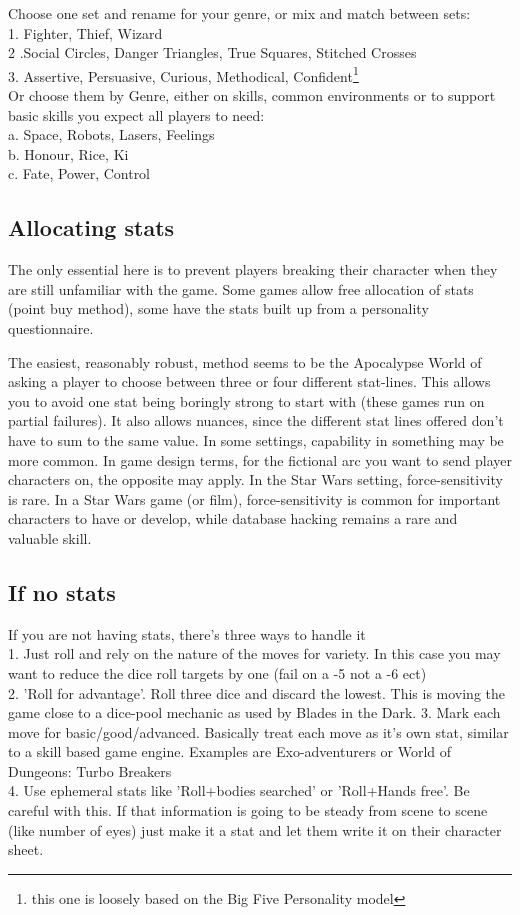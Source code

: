 \documentclass{tufte-handout}
\begin{document}
Choose one set and rename for your genre, or mix and match between sets:\\
1. Fighter, Thief, Wizard\\
2 .Social Circles, Danger Triangles, True Squares, Stitched Crosses \\
3. Assertive, Persuasive, Curious, Methodical, Confident\footnote{this one is loosely based on the Big Five Personality model}\\

Or choose them by Genre, either on skills, common environments or to support basic skills you expect all players to need:\\ 
a. Space, Robots, Lasers,  Feelings\\
b. Honour, Rice, Ki\\
c. Fate, Power, Control \\

\subsection{Allocating stats}

The only essential here is to prevent players breaking their character when they are still unfamiliar with the game. Some games allow free allocation of stats (point buy method), some have the stats built up from a personality questionnaire.

The easiest, reasonably robust, method seems to be the Apocalypse World of asking a player to choose between three or four different stat-lines. This allows you to avoid one stat being boringly strong to start with (these games run on partial failures). It also allows nuances, since the different stat lines offered don't have to sum to the same value. In some settings, capability in something may be more common. In game design terms, for the fictional arc you want to send player characters on, the opposite may apply. In the Star Wars setting, force-sensitivity is rare. In a Star Wars game (or film), force-sensitivity is common for important characters to have or develop, while database hacking remains a rare and valuable skill. 


\subsection{If no stats}
If you are not having stats, there's three ways to  handle it\\
1. Just roll and rely on the nature of the moves for variety. In this case you may want to reduce the dice roll targets by one (fail on a -5 not a -6 ect)\\
2. 'Roll for advantage'. Roll three dice and discard the lowest. This is moving the game close to a dice-pool mechanic as used by Blades in the Dark.
3. Mark each move for basic/good/advanced. Basically treat each move as it's own stat, similar to a skill based game engine. Examples are Exo-adventurers or World of Dungeons: Turbo Breakers\\
4. Use ephemeral stats like 'Roll+bodies searched' or 'Roll+Hands free'. Be careful with this. If that information is going to be steady from scene to scene (like number of eyes) just make it a stat and let them write it on their character sheet.
\end{document}
